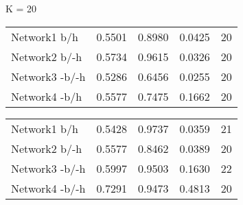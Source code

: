 \begin{table*}[h]

	\begin{minipage}[h]{0.45\linewidth} 
K = 20
\begin{tabular}{lrrrr}

 Network1 b/h           &   0.5501 &      0.8980 &   0.0425 & 20 \\
 Network2 b/-h        &   0.5734 &      0.9615 &   0.0326 & 20 \\
 Network3 -b/-h       &   0.5286 &      0.6456 &   0.0255 & 20 \\
 Network4 -b/h         &   0.5577 &      0.7475 &   0.1662 & 20 \\
\hline
\end{tabular}
\end{minipage}
\hspace{0.8cm}
\begin{minipage}[h]{0.45\linewidth}
\begin{tabular}{lrrrr}
 Network1 b/h         &   0.5428 &      0.9737 &   0.0359 &  21 \\
 Network2 b/-h      &   0.5577 &      0.8462 &   0.0389 &  20 \\
 Network3 -b/-h     &   0.5997 &      0.9503 &   0.1630 &  22 \\
 Network4 -b/-h      &   0.7291 &      0.9473 &   0.4813 & 20 \\
\hline
\end{tabular}
\end{minipage}
\end{table*}

